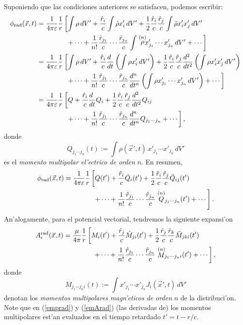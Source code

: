 Suponiendo que las condiciones anteriores se satisfacen, podemos escribir:
\begin{align}
\phi_{\rm rad}(\vec{x},t)
 &= \frac{1}{4\pi\varepsilon}\frac{1}{r}\left[  \int\rho\,dV'+\frac{\hat{r}_i}{c}\int\dot{\rho}x'_i\,dV'+\frac{1}{2}\frac{\hat{r}_i}{c}\frac{\hat{r}_j}{c}\int\ddot{\rho}x'_ix'_j\,dV'\right. \nonumber \\
 &\qquad\qquad\  \left.+\cdots +
\frac{1}{n!}\frac{\hat{r}_{j_1}}{c}\cdots\frac{\hat{r}_{j_n}}{c}\int\stackrel{(n)}{\rho}\!\!\!x'_{j_1}\cdots x'_{j_n}\,dV'+\cdots\right] \\
 &= \frac{1}{4\pi\varepsilon}\frac{1}{r}\left[  \int\rho\,dV'+\frac{\hat{r}_i}{c}\frac{d\ }{dt}\left(\int\rho x'_i\,dV'\right)+\frac{1}{2}\frac{\hat{r}_i}{c}\frac{\hat{r}_j}{c}\frac{d^2\ }{dt^2}\left(\int\rho x'_ix'_j\,dV'\right)\right. \nonumber \\
 &\qquad\qquad\ \left.+\cdots +
\frac{1}{n!}\frac{\hat{r}_{j_1}}{c}\cdots\frac{\hat{r}_{j_n}}{c}\frac{d^n\ }{dt^n}\left(\int\rho x'_{j_1}\cdots x'_{j_n}\,dV'\right) +\cdots\right] \\
 &= \frac{1}{4\pi\varepsilon}\frac{1}{r}\left[  Q+\frac{\hat{r}_i}{c}\frac{d\ }{dt}Q_i+\frac{1}{2}\frac{\hat{r}_i}{c}\frac{\hat{r}_j}{c}\frac{d^2\ }{dt^2}Q_{ij}\right. \nonumber \\
 &\qquad\qquad\ \left.+\cdots +\frac{1}{n!}\frac{\hat{r}_{j_1}}{c}\cdots\frac{\hat{r}_{j_n}}{c}\frac{d^n\ }{dt^n}Q_{j_1\cdots j_n} +\cdots\right] ,
\end{align}
donde
\begin{equation}
 Q_{j_1\cdots j_n}(t):=\int\rho(\vec{x}',t)\, x'_{j_1}\cdots x'_{j_n}\,dV'
\end{equation}
es el \textit{momento multipolar el'ectrico de orden} $n$. En resumen,
\begin{align}
 \phi_{\rm rad}(\vec{x},t) &= \frac{1}{4\pi\varepsilon}\frac{1}{r}\left[  Q(t')+\frac{\hat{r}_i}{c}\dot{Q}_i(t')+\frac{1}{2}\frac{\hat{r}_i}{c}\frac{\hat{r}_j}{c}\ddot{Q}_{ij}(t') \right.\nonumber\\
& \qquad\qquad\ \left.+\cdots +\frac{1}{n!}\frac{\hat{r}_{j_1}}{c}\cdots\frac{\hat{r}_{j_n}}{c}\stackrel{(n)}{Q}\!\!{}_{j_1\cdots j_n}(t') +\cdots\right] .  \label{emprad}
\end{align}
An'alogamente, para el potencial vectorial, tendremos la siguiente expansi'on
\begin{align}
A_i^{\rm rad}(\vec{x},t) &= \frac{\mu}{4\pi}\frac{1}{r}\left[  M_i(t')+\frac{\hat{r}_j}{c}\dot{M}_{ji}(t')+\frac{1}{2}\frac{\hat{r}_j}{c}\frac{\hat{r}_k}{c}\ddot{M}_{jki}(t')\right.\nonumber\\
& \qquad\qquad\ \left.+\cdots +\frac{1}{n!}\frac{\hat{r}_{j_1}}{c}\cdots\frac{\hat{r}_{j_n}}{c}\stackrel{(n)}{M}\!\!{}_{j_1\cdots j_ni}(t') +\cdots\right] , \label{emArad}
\end{align}
donde
\begin{equation}
 M_{j_1\cdots j_ni}(t):=\int x'_{j_1}\cdots x'_{j_n}J_i(\vec{x}',t)\,dV'
\end{equation}
denotan los \textit{momentos multipolares magn'eticos de orden} $n$ de la distribuci'on. Note que en (\ref{emprad}) y (\ref{emArad}) (las derivadas de) los momentos multipolares est'an evaluados en el tiempo retardado $t'=t-r/c$.

